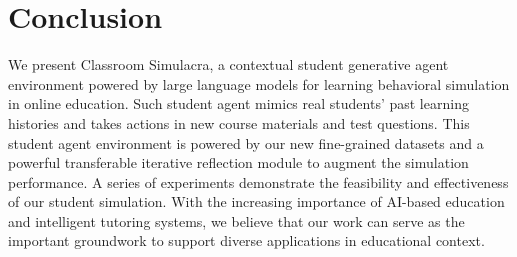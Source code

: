 \section{Conclusion}

We present Classroom Simulacra, a contextual student generative agent environment powered by large language models for learning behavioral simulation in online education. Such student agent mimics real students' past learning histories and takes actions in new course materials and test questions. This student agent environment is powered by our new fine-grained datasets and a powerful transferable iterative reflection module to augment the simulation performance. A series of experiments demonstrate the feasibility and effectiveness of our student simulation. With the increasing importance of AI-based education and intelligent tutoring systems, we believe that our work can serve as the important groundwork to support diverse applications in educational context.
